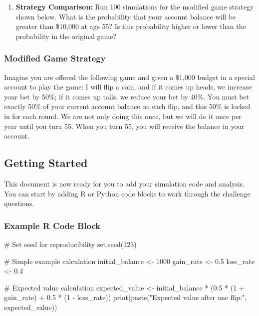 \documentclass[
  letterpaper,
  DIV=11,
  numbers=noendperiod]{scrartcl}
\newenvironment{Shaded}{\begin{snugshade}}{\end{snugshade}}
\newcommand{\CommentTok}[1]{\textcolor[rgb]{0.37,0.37,0.37}{#1}}
\newcommand{\DecValTok}[1]{\textcolor[rgb]{0.68,0.00,0.00}{#1}}
\newcommand{\FloatTok}[1]{\textcolor[rgb]{0.68,0.00,0.00}{#1}}
\newcommand{\FunctionTok}[1]{\textcolor[rgb]{0.28,0.35,0.67}{#1}}
\newcommand{\NormalTok}[1]{\textcolor[rgb]{0.00,0.23,0.31}{#1}}
\newcommand{\OtherTok}[1]{\textcolor[rgb]{0.00,0.23,0.31}{#1}}
\newcommand{\SpecialCharTok}[1]{\textcolor[rgb]{0.37,0.37,0.37}{#1}}
\newcommand{\StringTok}[1]{\textcolor[rgb]{0.13,0.47,0.30}{#1}}
\providecommand{\tightlist}{%
  \setlength{\itemsep}{0pt}\setlength{\parskip}{0pt}}
\begin{document}
\begin{enumerate}
\def\labelenumi{\arabic{enumi}.}
\setcounter{enumi}{5}
\tightlist
\item
  \textbf{Strategy Comparison:} Run 100 simulations for the modified
  game strategy shown below. What is the probability that your account
  balance will be greater than \$10,000 at age 55? Is this probability
  higher or lower than the probability in the original game?
\end{enumerate}

\subsubsection{Modified Game Strategy}\label{modified-game-strategy}

Imagine you are offered the following game and given a \$1,000 budget in
a special account to play the game: I will flip a coin, and if it comes
up heads, we increase your bet by 50\%; if it comes up tails, we reduce
your bet by 40\%. You must bet exactly 50\% of your current account
balance on each flip, and this 50\% is locked in for each round. We are
not only doing this once, but we will do it once per year until you turn
55. When you turn 55, you will receive the balance in your account.

\subsection{Getting Started}\label{getting-started}

This document is now ready for you to add your simulation code and
analysis. You can start by adding R or Python code blocks to work
through the challenge questions.

\subsubsection{Example R Code Block}\label{example-r-code-block}

\begin{Shaded}
\begin{Highlighting}[]
\CommentTok{\# Set seed for reproducibility}
\FunctionTok{set.seed}\NormalTok{(}\DecValTok{123}\NormalTok{)}

\CommentTok{\# Simple example calculation}
\NormalTok{initial\_balance }\OtherTok{\textless{}{-}} \DecValTok{1000}
\NormalTok{gain\_rate }\OtherTok{\textless{}{-}} \FloatTok{0.5}
\NormalTok{loss\_rate }\OtherTok{\textless{}{-}} \FloatTok{0.4}

\CommentTok{\# Expected value calculation}
\NormalTok{expected\_value }\OtherTok{\textless{}{-}}\NormalTok{ initial\_balance }\SpecialCharTok{*}\NormalTok{ (}\FloatTok{0.5} \SpecialCharTok{*}\NormalTok{ (}\DecValTok{1} \SpecialCharTok{+}\NormalTok{ gain\_rate) }\SpecialCharTok{+} \FloatTok{0.5} \SpecialCharTok{*}\NormalTok{ (}\DecValTok{1} \SpecialCharTok{{-}}\NormalTok{ loss\_rate))}
\FunctionTok{print}\NormalTok{(}\FunctionTok{paste}\NormalTok{(}\StringTok{"Expected value after one flip:"}\NormalTok{, expected\_value))}
\end{Highlighting}
\end{Shaded}
\end{document}
